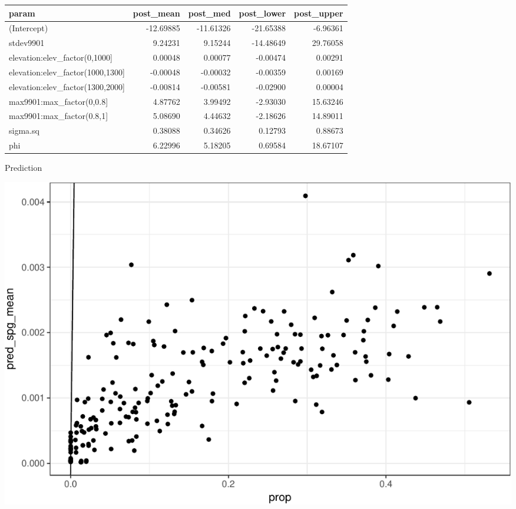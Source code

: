 \documentclass[11pt,ignorenonframetext,]{beamer}
\newenvironment{Shaded}{}{}
\newcommand{\DataTypeTok}[1]{\textcolor[rgb]{0.56,0.13,0.00}{#1}}
\newcommand{\DecValTok}[1]{\textcolor[rgb]{0.25,0.63,0.44}{#1}}
\newcommand{\KeywordTok}[1]{\textcolor[rgb]{0.00,0.44,0.13}{\textbf{#1}}}
\newcommand{\NormalTok}[1]{#1}
\newcommand{\OperatorTok}[1]{\textcolor[rgb]{0.40,0.40,0.40}{#1}}
\newcommand{\StringTok}[1]{\textcolor[rgb]{0.25,0.44,0.63}{#1}}
\let\oldShaded\Shaded
\let\endoldShaded\endShaded
\renewenvironment{Shaded}{\footnotesize\begin{spacing}{0.9}\oldShaded}{\endoldShaded\end{spacing}}
\begin{document}
\begin{frame}[fragile]{}
\protect\hypertarget{section-1}{}

\footnotesize

\begin{Shaded}
\end{Shaded}

\begin{longtable}[]{@{}lrrrr@{}}
\toprule
param & post\_mean & post\_med & post\_lower &
post\_upper\tabularnewline
\midrule
\endhead
(Intercept) & -12.69885 & -11.61326 & -21.65388 &
-6.96361\tabularnewline
stdev9901 & 9.24231 & 9.15244 & -14.48649 & 29.76058\tabularnewline
elevation:elev\_factor(0,1000{]} & 0.00048 & 0.00077 & -0.00474 &
0.00291\tabularnewline
elevation:elev\_factor(1000,1300{]} & -0.00048 & -0.00032 & -0.00359 &
0.00169\tabularnewline
elevation:elev\_factor(1300,2000{]} & -0.00814 & -0.00581 & -0.02900 &
0.00004\tabularnewline
max9901:max\_factor(0,0.8{]} & 4.87762 & 3.99492 & -2.93030 &
15.63246\tabularnewline
max9901:max\_factor(0.8,1{]} & 5.08690 & 4.44632 & -2.18626 &
14.89011\tabularnewline
sigma.sq & 0.38088 & 0.34626 & 0.12793 & 0.88673\tabularnewline
phi & 6.22996 & 5.18205 & 0.69584 & 18.67107\tabularnewline
\bottomrule
\end{longtable}

\end{frame}

\begin{frame}{Prediction}
\protect\hypertarget{prediction}{}

\begin{center}\includegraphics[width=\textwidth]{Lec20_files/figure-beamer/unnamed-chunk-13-1} \end{center}

\end{frame}
\end{document}
